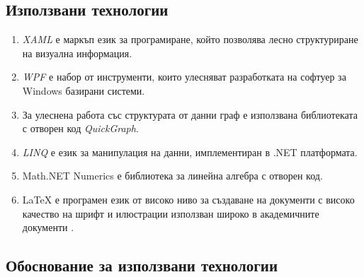 \subsection{Използвани технологии}


\begin{enumerate}
  разработката на приложението е използвана интегрираната среда за разработка на софтуер \textit{Visual Studio 2017}. 
  програмен език е \textit{C Sharp}. 
  визуализацията на примитиви в 3D е използвана библиотеката с отворен код \textit{Helix Toolkit 3D}. Позволява достъп до вече настроен viewport, както и някои базови за работата с 3D обекти функции – ротация, транслация и увеличение.
 
 \item \textit{XAML} е маркъп език за програмиране, който позволява лесно структуриране на визуална информация.
 
 \item \textit{WPF} е набор от инструменти, които улесняват разработката на софтуер за Windows базирани системи.
 
 \item За улеснена работа със структурата от данни граф е използвана библиотеката с отворен код \textit{QuickGraph}. 
 
 \item \textit{LINQ} е език за манипулация на данни, имплементиран в .NET платформата.
 
 \item Math.NET Numerics е библиотека за линейна алгебра с отворен код.
 
 \item LaTeX е програмен език от високо ниво за създаване на документи с високо качество на шрифт и илюстрации използван широко в академичните документи \cite{latexUsage} \cite{latexUsage2}.
\end{enumerate}

\subsection{Обоснование за използвани технологии}

